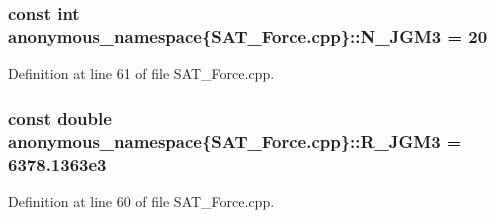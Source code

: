 \hypertarget{namespaceanonymous__namespace_02SAT__Force_8cpp_03_a21c47b295844aa01ef36e5769862e2a3}{
\subsubsection[{N\-\_\-\-J\-G\-M3}]{\setlength{\rightskip}{0pt plus 5cm}const int anonymous\-\_\-namespace\{S\-A\-T\-\_\-\-Force.\-cpp\}\-::N\-\_\-\-J\-G\-M3 = 20}}\label{namespaceanonymous__namespace_02SAT__Force_8cpp_03_a21c47b295844aa01ef36e5769862e2a3}


Definition at line 61 of file S\-A\-T\-\_\-\-Force.\-cpp.

\hypertarget{namespaceanonymous__namespace_02SAT__Force_8cpp_03_adc98a306a4a3c40934f207108c4f2d3a}{
\subsubsection[{R\-\_\-\-J\-G\-M3}]{\setlength{\rightskip}{0pt plus 5cm}const double anonymous\-\_\-namespace\{S\-A\-T\-\_\-\-Force.\-cpp\}\-::R\-\_\-\-J\-G\-M3 = 6378.\-1363e3}}\label{namespaceanonymous__namespace_02SAT__Force_8cpp_03_adc98a306a4a3c40934f207108c4f2d3a}


Definition at line 60 of file S\-A\-T\-\_\-\-Force.\-cpp.

